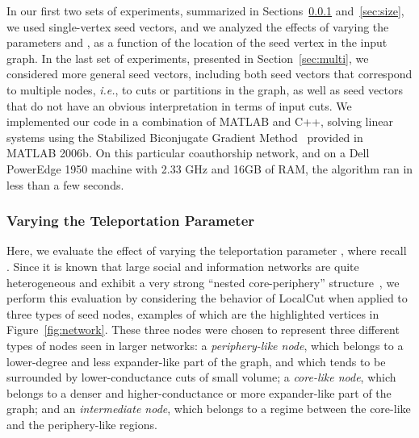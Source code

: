 \documentclass[11pt]{article}
\begin{document}
In our first two sets of experiments, summarized in 
Sections~\ref{sec:teleport} and~\ref{sec:size}, we used single-vertex seed 
vectors, and we analyzed the effects of varying the parameters  and 
, as a function of the location of the seed vertex in the input graph.
In the last set of experiments, presented in Section~\ref{sec:multi}, we 
considered more general seed vectors, including both seed vectors that 
correspond to multiple nodes, \emph{i.e.}, to cuts or partitions in the 
graph, as well as seed vectors that do not have an obvious interpretation in 
terms of input cuts.
We implemented our code in a combination of MATLAB and C++, solving linear 
systems using the Stabilized Biconjugate Gradient Method~\cite{bicg92} 
provided in MATLAB 2006b. 
On this particular coauthorship network, and on a Dell PowerEdge 1950 
machine with 2.33 GHz and 16GB of RAM, the algorithm ran in less than a few 
seconds.



\subsubsection{Varying the Teleportation Parameter}
\label{sec:teleport}

Here, we evaluate the effect of varying the teleportation parameter 
, where recall .
Since it is known that large social and information networks are quite 
heterogeneous and exhibit a very strong ``nested core-periphery'' 
structure~\cite{LLDM08_communities_CONF,LLDM09_communities_IM,LLM10_communities_CONF}, 
we perform this evaluation by considering the behavior of \textsf{LocalCut} 
when applied to three types of seed nodes, examples of which are the 
highlighted vertices in Figure~\ref{fig:network}.
These three nodes were chosen to represent three different types of nodes
seen in larger networks: 
a \textit{periphery-like node}, which belongs to a lower-degree and less 
expander-like part of the graph, and which tends to be surrounded by 
lower-conductance cuts of small volume; 
a \textit{core-like node}, which belongs to a denser and higher-conductance 
or more expander-like part of the graph; and 
an \textit{intermediate node}, which belongs to a regime between the 
core-like and the periphery-like regions.
\end{document}
